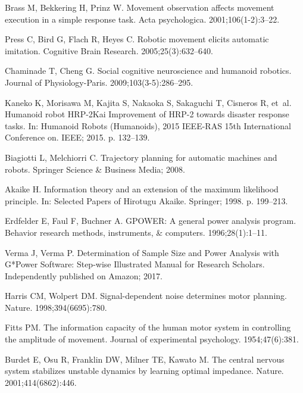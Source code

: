 \begin{thebibliography}{10}
	Brass M, Bekkering H, Prinz W.
	\newblock Movement observation affects movement execution in a simple response
	task.
	\newblock Acta psychologica. 2001;106(1-2):3--22.
	
	Press C, Bird G, Flach R, Heyes C.
	\newblock Robotic movement elicits automatic imitation.
	\newblock Cognitive Brain Research. 2005;25(3):632--640.
	
	Chaminade T, Cheng G.
	\newblock Social cognitive neuroscience and humanoid robotics.
	\newblock Journal of Physiology-Paris. 2009;103(3-5):286--295.
	
	Kaneko K, Morisawa M, Kajita S, Nakaoka S, Sakaguchi T, Cisneros R, et~al.
	\newblock Humanoid robot HRP-2Kai Improvement of HRP-2 towards disaster
	response tasks.
	\newblock In: Humanoid Robots (Humanoids), 2015 IEEE-RAS 15th International
	Conference on. IEEE; 2015. p. 132--139.
	
	Biagiotti L, Melchiorri C.
	\newblock Trajectory planning for automatic machines and robots.
	\newblock Springer Science \& Business Media; 2008.
	
	Akaike H.
	\newblock Information theory and an extension of the maximum likelihood
	principle.
	\newblock In: Selected Papers of Hirotugu Akaike. Springer; 1998. p. 199--213.
	
	Erdfelder E, Faul F, Buchner A.
	\newblock GPOWER: A general power analysis program.
	\newblock Behavior research methods, instruments, \& computers.
	1996;28(1):1--11.
	
	Verma J, Verma P.
	\newblock Determination of Sample Size and Power Analysis with G*Power
	Software: Step-wise Illustrated Manual for Research Scholars.
	\newblock Independently published on Amazon; 2017.
	
	Harris CM, Wolpert DM.
	\newblock Signal-dependent noise determines motor planning.
	\newblock Nature. 1998;394(6695):780.
	
	Fitts PM.
	\newblock The information capacity of the human motor system in controlling the
	amplitude of movement.
	\newblock Journal of experimental psychology. 1954;47(6):381.
	
	Burdet E, Osu R, Franklin DW, Milner TE, Kawato M.
	\newblock The central nervous system stabilizes unstable dynamics by learning
	optimal impedance.
	\newblock Nature. 2001;414(6862):446.
	

\end{thebibliography}

